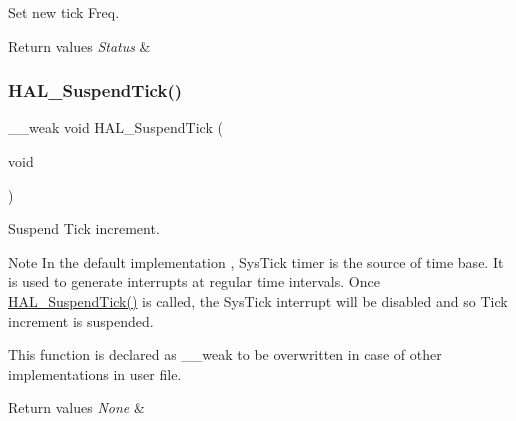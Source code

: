 Set new tick Freq. 


\begin{DoxyRetVals}{Return values}
{\em Status} & \\
\hline
\end{DoxyRetVals}
\mbox{\label{group___h_a_l___exported___functions___group2_ga84ae4b045c45d49d96b2b02e2dc516b6}} 
\subsubsection{\texorpdfstring{H\+A\+L\+\_\+\+Suspend\+Tick()}{HAL\_SuspendTick()}}
{\footnotesize\ttfamily \+\_\+\+\_\+weak void H\+A\+L\+\_\+\+Suspend\+Tick (\begin{DoxyParamCaption}\item[{void}]{ }\end{DoxyParamCaption})}



Suspend Tick increment. 

\begin{DoxyNote}{Note}
In the default implementation , Sys\+Tick timer is the source of time base. It is used to generate interrupts at regular time intervals. Once \mbox{\hyperlink{group___h_a_l___exported___functions___group2_ga84ae4b045c45d49d96b2b02e2dc516b6}{H\+A\+L\+\_\+\+Suspend\+Tick()}} is called, the Sys\+Tick interrupt will be disabled and so Tick increment is suspended. 

This function is declared as \+\_\+\+\_\+weak to be overwritten in case of other implementations in user file. 
\end{DoxyNote}

\begin{DoxyRetVals}{Return values}
{\em None} & \\
\hline
\end{DoxyRetVals}
